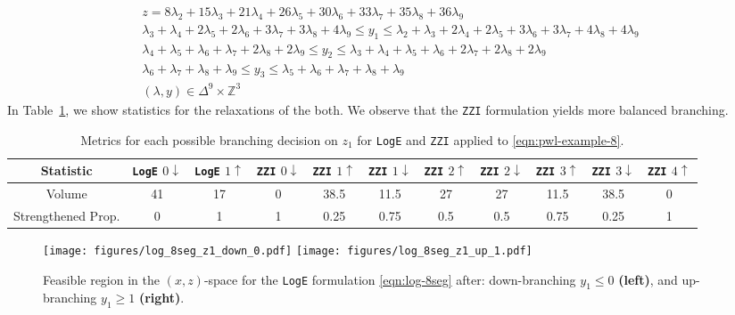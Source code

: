 \documentclass[opre,nonblindrev]{informs3} %
\newcommand{\bbZ}{\mathbb{Z}}
\newcommand{\ZZI}{\texttt{ZZI}}
\newcommand{\Log}{\texttt{LogE}}
\begin{document}
\begin{APPENDICES}
\begin{subequations}
\begin{gather}
    z = 8\lambda_2 + 15\lambda_3 + 21\lambda_4 + 26\lambda_5 + 30\lambda_6 + 33\lambda_7 + 35\lambda_8 + 36\lambda_9 \\
    \lambda_3 + \lambda_4 + 2\lambda_5 + 2\lambda_6 + 3\lambda_7 + 3\lambda_8 + 4\lambda_9 \leq y_1 \leq \lambda_2 + \lambda_3 + 2\lambda_4 + 2\lambda_5 + 3\lambda_6 + 3\lambda_7 + 4\lambda_8 + 4\lambda_9 \\
    \lambda_4 + \lambda_5 + \lambda_6 + \lambda_7 + 2\lambda_8 + 2\lambda_9 \leq y_2 \leq \lambda_3 + \lambda_4 + \lambda_5 + \lambda_6 + 2\lambda_7 + 2\lambda_8 + 2\lambda_9 \\
    \lambda_6 + \lambda_7 + \lambda_8 + \lambda_9 \leq y_3 \leq \lambda_5 + \lambda_6 + \lambda_7 + \lambda_8 + \lambda_9 \\
    (\lambda,y) \in \Delta^9 \times \bbZ^3
\end{gather}
\end{subequations}
In Table~\ref{tab:pwl-example-8}, we show statistics for the relaxations of the both. We observe that the \ZZI{} formulation yields more balanced branching.
\begin{table}[htpb]
    \centering
    \smaller
    \begin{tabular}{c|cc||cc|cc|cc|cc}
         Statistic & \Log{} $0\downarrow$ & \Log{} $1\uparrow$ & \ZZI{} $0\downarrow$ & \ZZI{} $1\uparrow$ & \ZZI{} $1\downarrow$ & \ZZI{} $2\uparrow$ & \ZZI{} $2\downarrow$ & \ZZI{} $3\uparrow$ & \ZZI{} $3\downarrow$ & \ZZI{} $4\uparrow$ \\ \hline
         Volume & 41 & 17 & 0 & 38.5 & 11.5 & 27 & 27 & 11.5 & 38.5 & 0 \\
         Strengthened Prop. & 0 & 1 & 1 & 0.25 & 0.75 & 0.5 & 0.5 & 0.75 & 0.25 & 1
    \end{tabular}
    \caption{Metrics for each possible branching decision on $z_1$ for \Log{} and \ZZI{} applied to \eqref{eqn:pwl-example-8}.}
    \label{tab:pwl-example-8}
\end{table}

\begin{figure}[htpb]
    \centering

    \texttt{[image: figures/log\_8seg\_z1\_down\_0.pdf]}
    \texttt{[image: figures/log\_8seg\_z1\_up\_1.pdf]}

    \caption{Feasible region in the $(x,z)$-space for the \Log{} formulation \eqref{eqn:log-8seg} after: down-branching $y_1 \leq 0$ \textbf{(left)}, and up-branching $y_1 \geq 1$ \textbf{(right)}.}


\end{figure}
\end{APPENDICES}
\end{document}
